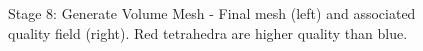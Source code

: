 \documentclass[fleqn,12pt,openany]{book}
\begin{document}
\begin{figure}[h!]
\begin{center}
\end{center}
\caption{\label{fig:MickeySurf}Stage 8: Generate Volume Mesh - Final mesh (left) and associated quality field (right).  Red tetrahedra are higher quality than blue.}
\end{figure} 
  
\end{document}
